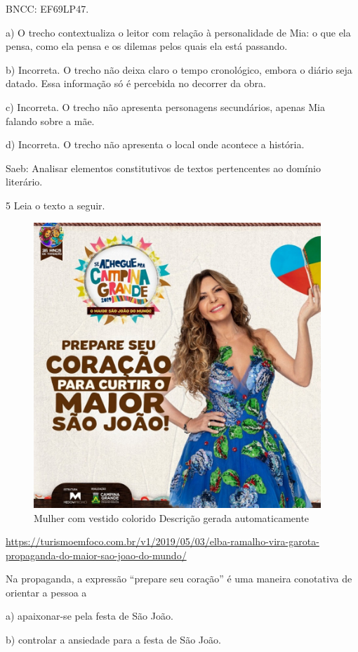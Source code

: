 {BNCC: EF69LP47.

a) O trecho contextualiza o leitor com relação à personalidade de Mia: o
que ela pensa, como ela pensa e os dilemas pelos quais ela está
passando.

b) Incorreta. O trecho não deixa claro o tempo cronológico, embora o
diário seja datado. Essa informação só é percebida no decorrer da obra.

c) Incorreta. O trecho não apresenta personagens secundários, apenas Mia
falando sobre a mãe.

d) Incorreta. O trecho não apresenta o local onde acontece a história.

Saeb: Analisar elementos constitutivos de textos pertencentes ao domínio
literário.

\num{5} Leia o texto a seguir.

\begin{figure}
\centering
\includegraphics[width=4.26392in,height=4.23333in]{./imgSAEB_6_POR/media/image40.jpeg}
\caption{Mulher com vestido colorido Descrição gerada automaticamente}
\end{figure}

\url{https://turismoemfoco.com.br/v1/2019/05/03/elba-ramalho-vira-garota-propaganda-do-maior-sao-joao-do-mundo/}

Na propaganda, a expressão ``prepare seu coração'' é uma maneira
conotativa de orientar a pessoa a

a) apaixonar-se pela festa de São João.

b) controlar a ansiedade para a festa de São João.

}
